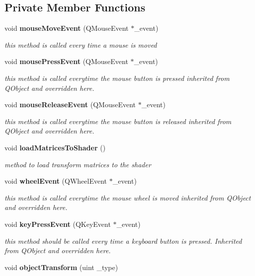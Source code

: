 \subsection*{Private Member Functions}
\begin{DoxyCompactItemize}
\item 
void {\bf mouse\-Move\-Event} (Q\-Mouse\-Event $\ast$\-\_\-event)
\begin{DoxyCompactList}\small\item\em this method is called every time a mouse is moved \end{DoxyCompactList}\item 
void {\bf mouse\-Press\-Event} (Q\-Mouse\-Event $\ast$\-\_\-event)
\begin{DoxyCompactList}\small\item\em this method is called everytime the mouse button is pressed inherited from Q\-Object and overridden here. \end{DoxyCompactList}\item 
void {\bf mouse\-Release\-Event} (Q\-Mouse\-Event $\ast$\-\_\-event)
\begin{DoxyCompactList}\small\item\em this method is called everytime the mouse button is released inherited from Q\-Object and overridden here. \end{DoxyCompactList}\item 
void {\bf load\-Matrices\-To\-Shader} ()
\begin{DoxyCompactList}\small\item\em method to load transform matrices to the shader \end{DoxyCompactList}\item 
void {\bf wheel\-Event} (Q\-Wheel\-Event $\ast$\-\_\-event)
\begin{DoxyCompactList}\small\item\em this method is called everytime the mouse wheel is moved inherited from Q\-Object and overridden here. \end{DoxyCompactList}\item 
void {\bf key\-Press\-Event} (Q\-Key\-Event $\ast$\-\_\-event)
\begin{DoxyCompactList}\small\item\em this method should be called every time a keyboard button is pressed. Inherited from Q\-Object and overridden here. \end{DoxyCompactList}\item 
void {\bf object\-Transform} (uint \-\_\-type)

\end{DoxyCompactItemize}
